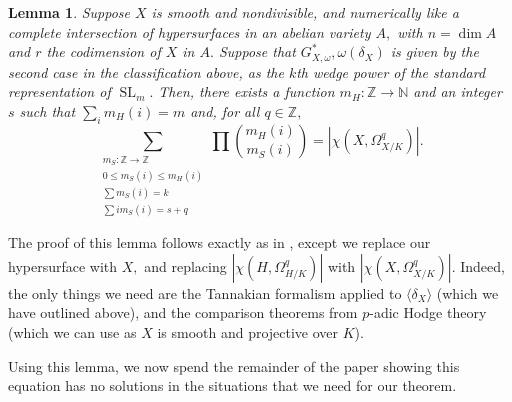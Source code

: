 \documentclass{article}
\newtheorem{lemma}[thm]{Lemma}
\theoremstyle{definition}
\theoremstyle{remark}
\DeclareMathOperator{\sll}{SL}
\begin{document}
\begin{lemma}\label{lem: numerical approach foundation}
Suppose $X$ is smooth and nondivisible, and numerically like a complete intersection of hypersurfaces in an abelian variety $A,$ with $n = \dim A$ and $r$ the codimension of $X$ in $A.$ Suppose that $G_{X, \omega}^*, \omega(\delta_X)$ is given by the second case in the classification above, as the $k$th wedge power of the standard representation of $\sll_m.$ Then, there exists a function $m_H: \mathbb{Z} \rightarrow \mathbb{N}$ and an integer $s$ such that $\sum\limits_{i} m_H(i) = m$ and, for all $q \in \mathbb{Z},$
\[\sum\limits_{\substack{m_S: \mathbb{Z} \rightarrow \mathbb{Z} \\ 0 \leq m_S(i) \leq m_H(i) \\ \sum m_S(i) = k \\ \sum im_S(i) = s + q}} \prod\limits \binom{m_H(i)}{m_S(i)} = |\chi(X, \Omega^q_{X/K})|.\]
\end{lemma}
The proof of this lemma follows exactly as in \cite{ls25}, except we replace our hypersurface with $X,$ and replacing $|\chi(H, \Omega^q_{H/K})|$ with $|\chi(X, \Omega^q_{X/K})|.$ Indeed, the only things we need are the Tannakian formalism applied to $\langle \delta_X \rangle$ (which we have outlined above), and the comparison theorems from $p$-adic Hodge theory (which we can use as $X$ is smooth and projective over $K$).
\par Using this lemma, we now spend the remainder of the paper showing this equation has no solutions in the situations that we need for our theorem.
\end{document}
